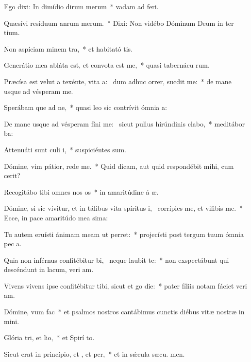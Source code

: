 \item Ego dixi: In dimídio dirum merum~* vadam ad  feri.
\item Quæsívi resíduum anrum merum.~* Dixi: Non vidébo Dóminum Deum in ter tium.
\item Non aspíciam minem tra,~* et habitató tis.
\item Generátio mea abláta est, et convota est  me,~* quasi tabernácu rum.
\item Præcísa est velut a texénte, vita a:~\pscross{} dum adhuc orrer, sucdit me:~* de mane usque ad vésperam  me.
\item Sperábam que ad ne,~* quasi leo sic contrívit ómnia  a:
\item De mane usque ad vésperam fíni me:~\pscross{} sicut pullus hirúndinis  clabo,~* meditábor  ba:
\item Attenuáti sunt culi i,~* suspiciéntes  sum.
\item Dómine, vim pátior, rede  me.~* Quid dicam, aut quid respondébit mihi, cum  cerit?
\item Recogitábo tibi omnes nos os~* in amaritúdine á æ.
\item Dómine, si sic vívitur, et in tálibus vita spíritus i,~\pscross{} corrípies me, et vifibis me.~* Ecce, in pace amaritúdo mea sima:
\item Tu autem eruísti ánimam meam ut  perret:~* projecísti post tergum tuum ómnia pec a.
\item Quia non inférnus confitébitur bi,~\pscross{} neque  laubit te:~* non exspectábunt qui descéndunt in lacum, veri am.
\item Vivens vivens ipse confitébitur tibi, sicut et go die:~* pater fíliis notam fáciet veri am.
\item Dómine, vum  fac~* et psalmos nostros cantábimus cunctis diébus vitæ nostræ in  mini.
\item Glória tri, et lio,~* et Spirí to.
\item Sicut erat in princípio, et , et per,~* et in sǽcula sæcu. men.
